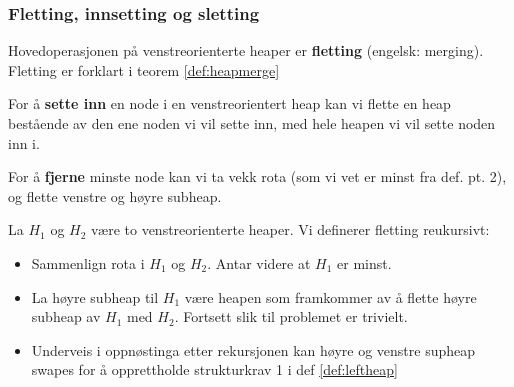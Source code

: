 \subsubsection{Fletting, innsetting og sletting}
Hovedoperasjonen på venstreorienterte heaper er \textbf{fletting} (engelsk: merging). Fletting er forklart i teorem \ref{def:heapmerge}

For å \textbf{sette inn} en node i en venstreorientert heap kan vi flette en heap bestående av den ene noden vi vil sette inn, med hele heapen vi vil sette noden inn i.

For å \textbf{fjerne} minste node kan vi ta vekk rota (som vi vet er minst fra def. pt. 2), og flette venstre og høyre subheap.


\begin{theorem}\label{def:heapmerge}
	La $ H_1 $ og $ H_2 $ være to venstreorienterte heaper. Vi definerer fletting reukursivt:
	\begin{itemize}
		\item Sammenlign rota i $ H_1 $ og $ H_2 $. Antar videre at $ H_1 $ er minst.
		\item La høyre subheap til $ H_1 $ være heapen som framkommer av å flette høyre subheap av $ H_1 $ med $ H_2 $. Fortsett slik til problemet er trivielt.
		\item Underveis i oppnøstinga etter rekursjonen kan høyre og venstre supheap swapes for å opprettholde strukturkrav 1 i def \ref{def:leftheap}
	\end{itemize}
\end{theorem}

